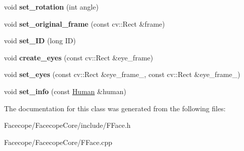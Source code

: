 \begin{DoxyCompactItemize}
\item 
\mbox{\label{classFFace_a40ca817ea963d26cc5eb9c74cdfa1f23}} 
void {\bfseries set\+\_\+rotation} (int angle)
\item 
\mbox{\label{classFFace_a797bd14396f31278615dca2be1faccbb}} 
void {\bfseries set\+\_\+original\+\_\+frame} (const cv\+::\+Rect \&frame)
\item 
\mbox{\label{classFFace_abb6be32d9a492f09ea546634d52625cb}} 
void {\bfseries set\+\_\+\+ID} (long ID)
\item 
\mbox{\label{classFFace_ac9288bb881068f095d6134fac2e86932}} 
void {\bfseries create\+\_\+eyes} (const cv\+::\+Rect \&eye\+\_\+frame)
\item 
\mbox{\label{classFFace_a1c38ba4370f0869574015386b57fd8d2}} 
void {\bfseries set\+\_\+eyes} (const cv\+::\+Rect \&eye\+\_\+frame\+\_, const cv\+::\+Rect \&eye\+\_\+frame\+\_)
\item 
\mbox{\label{classFFace_a58e3df53a38092ee907f83d4f906163b}} 
void {\bfseries set\+\_\+info} (const \hyperlink{structHuman}{Human} \&human)
\end{DoxyCompactItemize}


The documentation for this class was generated from the following files\+:\begin{DoxyCompactItemize}
\item 
Facecope/\+Facecope\+Core/include/F\+Face.\+h\item 
Facecope/\+Facecope\+Core/F\+Face.\+cpp\end{DoxyCompactItemize}
